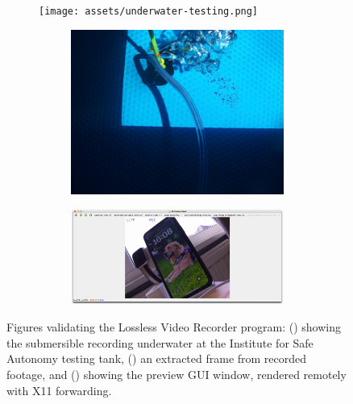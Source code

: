 \begin{figure}[H]
    \centering
    \begin{subfigure}{.49\textwidth}
        \centering
        \texttt{[image: assets/underwater-testing.png]}
        \caption{}
        \label{fig:underwater}
    \end{subfigure}
    \hfill
    \begin{subfigure}{.49\textwidth}
        \centering
        \begin{subfigure}{\textwidth}
            \centering
            \includegraphics[width=1\linewidth]{assets/rec-frame.png}
            \caption{}
            \label{fig:rec_frame}
        \end{subfigure}
        \vfill
        \begin{subfigure}{\textwidth}
            \centering
            \includegraphics[width=1\linewidth]{assets/rec_sc.png}
            \caption{}
            \label{fig:rec_sc}
        \end{subfigure}
    \end{subfigure}
    \caption{Figures validating the Lossless Video Recorder program: () showing the submersible recording underwater at the Institute for Safe Autonomy testing tank, () an extracted frame from recorded footage, and () showing the preview GUI window, rendered remotely with X11 forwarding.}
    \label{fig:rec_validate}
\end{figure}

